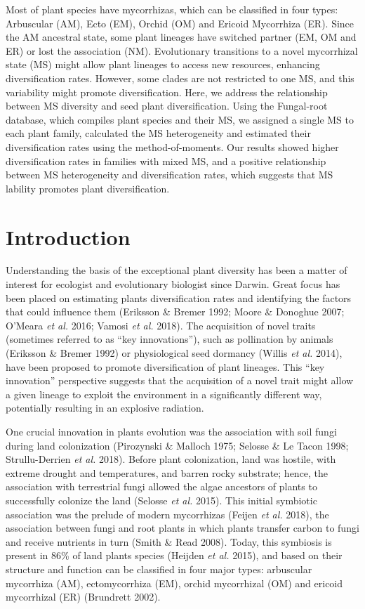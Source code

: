 \documentclass[12pt,]{article}
\begin{document}
Most of plant species have mycorrhizas, which can be classified in four
types: Arbuscular (AM), Ecto (EM), Orchid (OM) and Ericoid Mycorrhiza
(ER). Since the AM ancestral state, some plant lineages have switched
partner (EM, OM and ER) or lost the association (NM). Evolutionary
transitions to a novel mycorrhizal state (MS) might allow plant lineages
to access new resources, enhancing diversification rates. However, some
clades are not restricted to one MS, and this variability might promote
diversification. Here, we address the relationship between MS diversity
and seed plant diversification. Using the Fungal-root database, which
compiles plant species and their MS, we assigned a single MS to each
plant family, calculated the MS heterogeneity and estimated their
diversification rates using the method-of-moments. Our results showed
higher diversification rates in families with mixed MS, and a positive
relationship between MS heterogeneity and diversification rates, which
suggests that MS lability promotes plant diversification.

\hypertarget{introduction}{%
\section{Introduction}\label{introduction}}

Understanding the basis of the exceptional plant diversity has been a
matter of interest for ecologist and evolutionary biologist since
Darwin. Great focus has been placed on estimating plants diversification
rates and identifying the factors that could influence them (Eriksson \&
Bremer 1992; Moore \& Donoghue 2007; O'Meara \emph{et al.} 2016; Vamosi
\emph{et al.} 2018). The acquisition of novel traits (sometimes referred
to as ``key innovations''), such as pollination by animals (Eriksson \&
Bremer 1992) or physiological seed dormancy (Willis \emph{et al.} 2014),
have been proposed to promote diversification of plant lineages. This
``key innovation'' perspective suggests that the acquisition of a novel
trait might allow a given lineage to exploit the environment in a
significantly different way, potentially resulting in an explosive
radiation.

One crucial innovation in plants evolution was the association with soil
fungi during land colonization (Pirozynski \& Malloch 1975; Selosse \&
Le Tacon 1998; Strullu-Derrien \emph{et al.} 2018). Before plant
colonization, land was hostile, with extreme drought and temperatures,
and barren rocky substrate; hence, the association with terrestrial
fungi allowed the algae ancestors of plants to successfully colonize the
land (Selosse \emph{et al.} 2015). This initial symbiotic association
was the prelude of modern mycorrhizas (Feijen \emph{et al.} 2018), the
association between fungi and root plants in which plants transfer
carbon to fungi and receive nutrients in turn (Smith \& Read 2008).
Today, this symbiosis is present in 86\% of land plants species (Heijden
\emph{et al.} 2015), and based on their structure and function can be
classified in four major types: arbuscular mycorrhiza (AM),
ectomycorrhiza (EM), orchid mycorrhizal (OM) and ericoid mycorrhizal
(ER) (Brundrett 2002).
\end{document}
